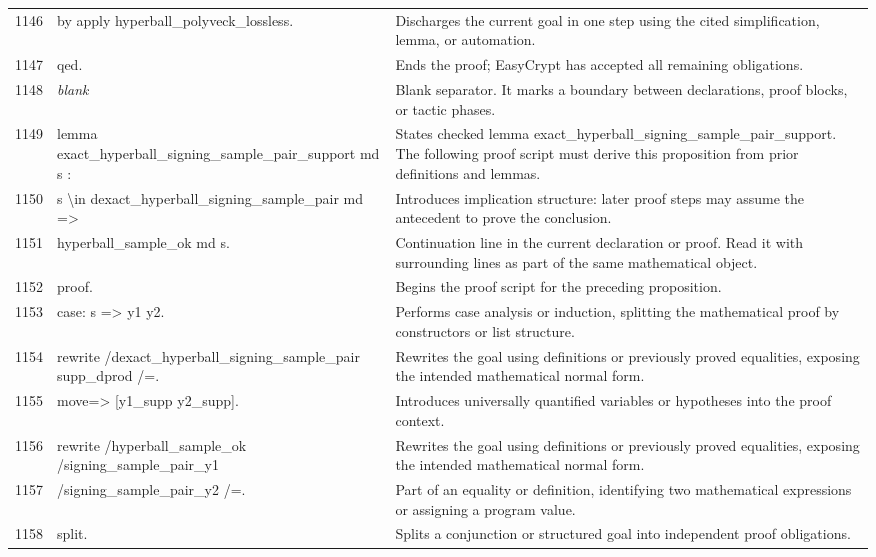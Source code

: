 \documentclass[10pt]{article}
\begin{document}
\begin{longtable}{r L{0.53\textwidth} L{0.37\textwidth}}
1146 & {\ttfamily\scriptsize by apply hyperball\_polyveck\_lossless.} & Discharges the current goal in one step using the cited simplification, lemma, or automation. \\
1147 & {\ttfamily\scriptsize qed.} & Ends the proof; EasyCrypt has accepted all remaining obligations. \\
1148 & {\ttfamily\scriptsize \emph{blank}} & Blank separator.  It marks a boundary between declarations, proof blocks, or tactic phases. \\
1149 & {\ttfamily\scriptsize lemma exact\_hyperball\_signing\_sample\_pair\_support md s :} & States checked lemma exact\_hyperball\_signing\_sample\_pair\_support.  The following proof script must derive this proposition from prior definitions and lemmas. \\
1150 & {\ttfamily\scriptsize   s \textbackslash{}in dexact\_hyperball\_signing\_sample\_pair md =>} & Introduces implication structure: later proof steps may assume the antecedent to prove the conclusion. \\
1151 & {\ttfamily\scriptsize   hyperball\_sample\_ok md s.} & Continuation line in the current declaration or proof.  Read it with surrounding lines as part of the same mathematical object. \\
1152 & {\ttfamily\scriptsize proof.} & Begins the proof script for the preceding proposition. \\
1153 & {\ttfamily\scriptsize case: s => y1 y2.} & Performs case analysis or induction, splitting the mathematical proof by constructors or list structure. \\
1154 & {\ttfamily\scriptsize rewrite /dexact\_hyperball\_signing\_sample\_pair supp\_dprod /=.} & Rewrites the goal using definitions or previously proved equalities, exposing the intended mathematical normal form. \\
1155 & {\ttfamily\scriptsize move=> [y1\_supp y2\_supp].} & Introduces universally quantified variables or hypotheses into the proof context. \\
1156 & {\ttfamily\scriptsize rewrite /hyperball\_sample\_ok /signing\_sample\_pair\_y1} & Rewrites the goal using definitions or previously proved equalities, exposing the intended mathematical normal form. \\
1157 & {\ttfamily\scriptsize         /signing\_sample\_pair\_y2 /=.} & Part of an equality or definition, identifying two mathematical expressions or assigning a program value. \\
1158 & {\ttfamily\scriptsize split.} & Splits a conjunction or structured goal into independent proof obligations. \\

\end{longtable}
\end{document}
